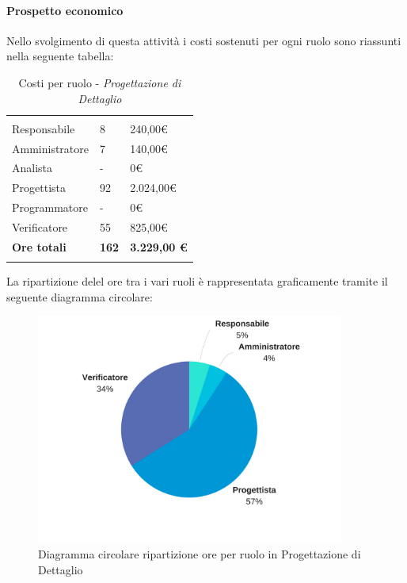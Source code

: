 			\paragraph{Prospetto economico} \Spazio
			Nello svolgimento di questa attività i costi sostenuti per ogni ruolo sono riassunti nella seguente tabella:
			\begin{table}[H]
			\centering
			\begin{tabular}{|p{4cm}|C{4cm}|C{4cm}|}
				
				 & &\\
				Responsabile & 8 & 240,00\euro \\
				\hline
				Amministratore& 7 & 140,00\euro \\
				\hline
				Analista & - & 0\euro \\
				\hline
				Progettista & 92 & 2.024,00\euro \\
				\hline
				Programmatore & - & 0\euro \\
				\hline
				Verificatore & 55 & 825,00\euro \\
				\hline
				\textbf{Ore totali} & \textbf{162} & \textbf{3.229,00 \euro} \\
			\end{tabular}
			\caption{Costi per ruolo - \textit{Progettazione di Dettaglio}}
		\end{table}
		
		La ripartizione delel ore tra i vari ruoli è rappresentata graficamente tramite il seguente diagramma circolare:
		
		\begin{figure}[H] 
			\centering 
			\includegraphics[width=0.9\textwidth]{images/CircolareProgettazioneDiDettaglio.png} 
			\caption{Diagramma circolare ripartizione ore per ruolo in Progettazione di Dettaglio}
			\label{CircolareProgettazioneDiDettaglio}
		\end{figure}		
		
